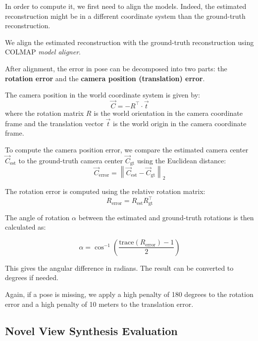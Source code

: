 In order to compute it, we first need to align the models. Indeed, the estimated reconstruction might be in a different coordinate system than the ground-truth reconstruction.

We align the estimated reconstruction with the ground-truth reconstruction using COLMAP \textit{model aligner}.

After alignment, the error in pose can be decomposed into two parts: the \textbf{rotation error} and the \textbf{camera position (translation) error}.

The camera position in the world coordinate system is given by:
\begin{equation}
    \vec{C} = -R^\top \cdot \vec{t}
\end{equation}
where the rotation matrix $R$ is the world orientation in the camera coordinate frame and the translation vector $\vec{t}$ is the world origin in the camera coordinate frame.

To compute the camera position error, we compare the estimated camera center $\vec{C}_{\text{est}}$ to the ground-truth camera center $\vec{C}_{\text{gt}}$ using the Euclidean distance:
\begin{equation}
    \vec{C}_{\text{error}} = \left\| \vec{C}_{\text{est}} - \vec{C}_{\text{gt}} \right\|_2
\end{equation}

The rotation error is computed using the relative rotation matrix:
\begin{equation}
    R_{\text{error}} = R_{\text{est}} R_{\text{gt}}^\top
\end{equation}

The angle of rotation $\alpha$ between the estimated and ground-truth rotations is then calculated as:

\begin{equation}
    \alpha = \cos^{-1}\left( \frac{\text{trace}(R_{\text{error}}) - 1}{2} \right)
\end{equation}

This gives the angular difference in radians. The result can be converted to degrees if needed.


Again, if a pose is missing, we apply a high penalty of 180 degrees to the rotation error and a high penalty of 10 meters to the translation error.


\subsection{Novel View Synthesis Evaluation}

